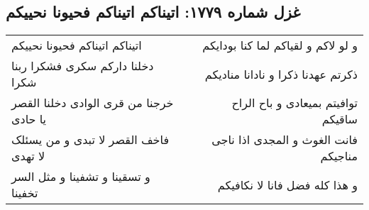 \begin{center}
\section*{غزل شماره ۱۷۷۹: اتیناکم اتیناکم فحیونا نحییکم}
\label{sec:1779}
\begin{longtable}{l p{0.5cm} r}
اتیناکم اتیناکم فحیونا نحییکم
&&
و لو لاکم و لقیاکم لما کنا بودایکم
\\
دخلنا دارکم سکری فشکرا ربنا شکرا
&&
ذکرتم عهدنا ذکرا و نادانا منادیکم
\\
خرجنا من قری الوادی دخلنا القصر یا حادی
&&
توافیتم بمیعادی و باح الراح ساقیکم
\\
فاخف القصر لا تبدی و من یسئلک لا تهدی
&&
فانت الغوث و المجدی اذا ناجی مناجیکم
\\
و تسقینا و تشفینا و مثل السر تخفینا
&&
و هذا کله فضل فانا لا نکافیکم
\\
\end{longtable}
\end{center}
